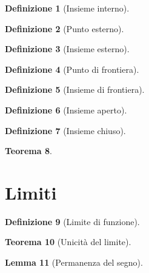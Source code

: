 \documentclass[a4paper,12pt]{report}
\theoremstyle{mystyle}
\newtheorem{theorem}{Teorema}[section]
\newtheorem{definition}[theorem]{Definizione}
\newtheorem{lemma}[theorem]{Lemma}
\begin{document}
\begin{definition}[Insieme interno]
    
\end{definition}

\begin{definition}[Punto esterno]
    
\end{definition}

\begin{definition}[Insieme esterno]
    
\end{definition}

\begin{definition}[Punto di frontiera]
    
\end{definition}

\begin{definition}[Insieme di frontiera]
    
\end{definition}

\begin{definition}[Insieme aperto]
    
\end{definition}

\begin{definition}[Insieme chiuso]
    
\end{definition}

\begin{theorem}
    
\end{theorem}

\section{Limiti}

\begin{definition}[Limite di funzione]
    
\end{definition}

\begin{theorem}[Unicità del limite]
    
\end{theorem}

\begin{lemma}[Permanenza del segno]
    
\end{lemma}
\end{document}
